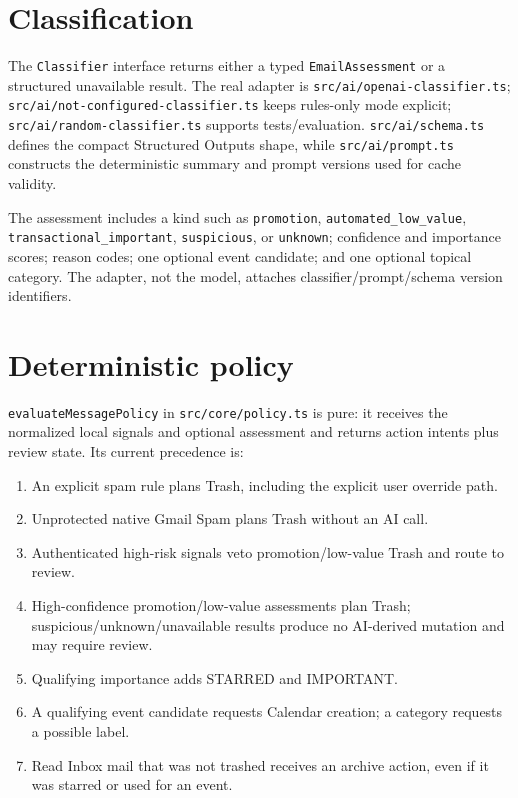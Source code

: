 \documentclass[12pt,oneside]{book}
\newcommand{\code}[1]{\nolinkurl{#1}}
\newcommand{\file}[1]{\nolinkurl{#1}}
\begin{document}
\section{Classification}

The \code{Classifier} interface returns either a typed \code{EmailAssessment} or a structured unavailable result. The real adapter is \file{src/ai/openai-classifier.ts}; \file{src/ai/not-configured-classifier.ts} keeps rules-only mode explicit; \file{src/ai/random-classifier.ts} supports tests/evaluation. \file{src/ai/schema.ts} defines the compact Structured Outputs shape, while \file{src/ai/prompt.ts} constructs the deterministic summary and prompt versions used for cache validity.

The assessment includes a kind such as \code{promotion}, \code{automated_low_value}, \code{transactional_important}, \code{suspicious}, or \code{unknown}; confidence and importance scores; reason codes; one optional event candidate; and one optional topical category. The adapter, not the model, attaches classifier/prompt/schema version identifiers.

\section{Deterministic policy}

\code{evaluateMessagePolicy} in \file{src/core/policy.ts} is pure: it receives the normalized local signals and optional assessment and returns action intents plus review state. Its current precedence is:

\begin{enumerate}
\item An explicit spam rule plans Trash, including the explicit user override path.
\item Unprotected native Gmail Spam plans Trash without an AI call.
\item Authenticated high-risk signals veto promotion/low-value Trash and route to review.
\item High-confidence promotion/low-value assessments plan Trash; suspicious/unknown/unavailable results produce no AI-derived mutation and may require review.
\item Qualifying importance adds STARRED and IMPORTANT.
\item A qualifying event candidate requests Calendar creation; a category requests a possible label.
\item Read Inbox mail that was not trashed receives an archive action, even if it was starred or used for an event.
\end{enumerate}
\end{document}
